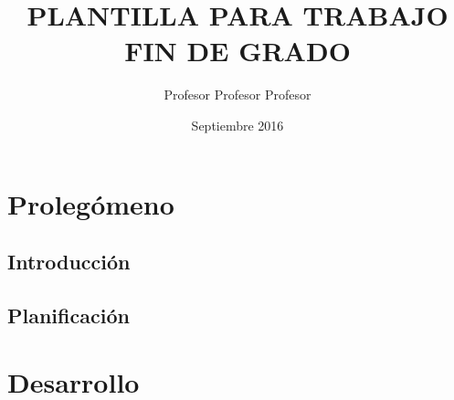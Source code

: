 \documentclass[a4paper,11pt,twoside]{book}
\title{PLANTILLA PARA TRABAJO FIN DE GRADO}
\author{Profesor Profesor Profesor}
\date{Septiembre 2016}
\begin{document}
\pagestyle{empty}


\cleardoublepage


\cleardoublepage


\newpage


\newpage


\frontmatter

\pagestyle{plain}

\tableofcontents
\listoffigures
\listoftables

\mainmatter



\part{Prolegómeno}



\chapter{Introducción}
\label{chap:chap01}


\chapter{Planificación}
\label{chap:chap02}


\part{Desarrollo}
\end{document}
